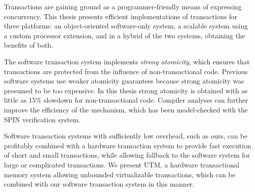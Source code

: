 
Transactions are gaining ground as a programmer-friendly means of
expressing concurrency.  This thesis presents efficient
implementations of transactions for three platforms: an
object-oriented software-only system, a scalable system using a custom
processor extension, and in a hybrid of the two systems, obtaining the
benefits of both.

The software transaction system implements \textit{strong atomicity},
which ensures that transactions are protected from the influence of
non-transactional code.  Previous software systems use weaker
atomicity guarantees because strong atomicity was presumed to be too
expensive.  In this thesis strong atomicity is obtained with as little
as 15\% slowdown for non-transactional code.  Compiler analyses can
further improve the efficiency of the mechanism, which has been
model-checked with the SPIN verification system.

Software transaction systems with sufficiently low overhead, such as
ours, can be profitably combined with a hardware transaction system to
provide fast execution of short and small transactions, while allowing
fallback to the software system for large or complicated transactions.
We present UTM, a hardware transactional memory system allowing
unbounded virtualizable transactions, which can be combined with our
software transaction system in this manner.
